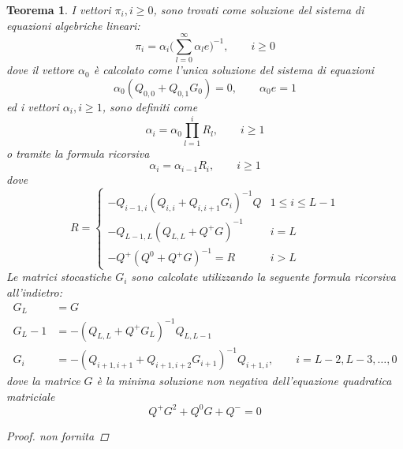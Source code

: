 \documentclass[11pt]{article}
\newtheorem{teorema}{Teorema}[section]
\begin{document}
\begin{teorema}
    I vettori $\pi_i, i \geq 0$, sono trovati come soluzione del sistema di equazioni algebriche lineari:
    \begin{equation}
        \pi_i = \alpha_i \big( \sum_{l=0}^\infty \alpha_l e \big)^{-1}, \qquad i \geq 0
    \end{equation}
    dove il vettore $\alpha_0$ è calcolato come l'unica soluzione del sistema di equazioni
    \begin{equation}
        \alpha_0(Q_{0,0} + Q_{0,1}G_0) = 0, \qquad \alpha_0e = 1
    \end{equation}
    ed i vettori $\alpha_i, i \geq 1$, sono definiti come
    \begin{equation}
        \alpha_i = \alpha_0 \prod_{l=1}^i R_l, \qquad i \geq 1
    \end{equation}
    o tramite la formula ricorsiva
    \begin{equation}\label{eq:rec-alpha}
        \alpha_i = \alpha_{i-1} R_i, \qquad i \geq 1
    \end{equation}
    dove
    \begin{equation}
        R =
        \begin{cases}
            -Q_{i-1,i}(Q_{i,i} + Q_{i,i+1}G_i)^{-1}Q & 1 \leq i \leq L-1 \\
            -Q_{L-1,L}(Q_{L,L} + Q^+G)^{-1} & i = L \\
            -Q^+(Q^0 + Q^+G)^{-1} = R & i>L
        \end{cases}
    \end{equation}
    Le matrici stocastiche $G_i$ sono calcolate utilizzando la seguente formula ricorsiva all'indietro:
    \begin{equation}
        \begin{split}
            G_L &= G \\
            G_L-1 &= -(Q_{L,L} + Q^+G_L)^{-1}Q_{L,L-1} \\
            G_i &= -(Q_{i+1,i+1} + Q_{i+1,i+2}G_{i+1})^{-1}Q_{i+1,i}, \qquad i = L-2, L-3, \dots, 0
        \end{split}
    \end{equation}
    dove la matrice $G$ è la minima soluzione non negativa dell'equazione quadratica matriciale
    \begin{equation}
        Q^+G^2 + Q^0G + Q^- = 0
    \end{equation}

    \begin{proof}
        non fornita
    \end{proof}
\end{teorema}
\end{document}
